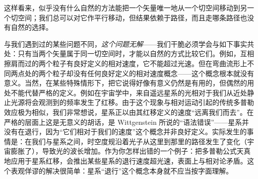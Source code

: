 这样看来，似乎没有什么自然的方法能把一个矢量唯一地从一个切空间移动到另一个切空间；我们总可以对它作平行移动，但结果依赖于路径，而且走哪条路径也没有自然的选择。

与我们遇到过的某些问题不同，\emph{这个问题无解}——我们干脆必须学会与如下事实共处：只有当两个矢量属于同一切空间时，才能以自然的方式比较它们。例如，互相擦肩而过的两个粒子有良好定义的相对速度，它不能超过光速。但在弯曲流形上不同两点处的两个粒子却没有任何良好定义的相对速度概念——这个概念根本就没有意义。当然，在某些特殊情形下，把它说得好像有意义仍然是有用的，但偶然的用处不能代替严格的定义。例如在宇宙学中，来自遥远星系的光相对于我们从近处静止光源将会观测到的频率发生了红移。由于这个现象与相对运动引起的传统多普勒效应极为相似，我们非常想说，星系正以由其红移定义的速度“远离我们而去”。在严格的层面上这是无意义的胡话，是 Wittgenstein 所说的“语法错误”——星系并没有在退行，因为“它们相对于我们的速度”这个概念并非良好定义。实际发生的事情是：在我们与星系之间，时空度规沿着光子从这里到那里的路径发生了变化（宇宙膨胀了），导致光的波长增加。作为你怎样出错的一个例子：把多普勒公式天真地应用于星系红移，会推出某些星系的退行速度超光速，表面上与相对论矛盾。这个表观佯谬的解决很简单：星系“退行”这个概念本身就不应当按字面理解。


